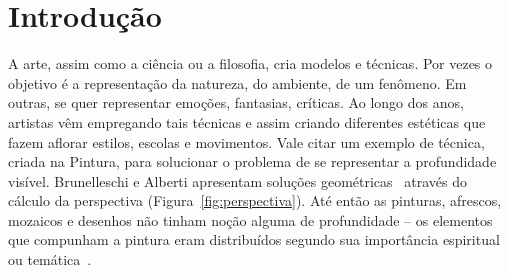 



\chapter{Introdução}
\label{cap:intro} 



A arte, assim como a ciência ou a filosofia, cria modelos e
técnicas. Por vezes o objetivo é a representação da natureza, do
ambiente, de um fenômeno. Em outras, se quer representar emoções,
fantasias, críticas. Ao longo dos anos, artistas vêm empregando tais
técnicas e assim criando diferentes estéticas que fazem aflorar
estilos, escolas e movimentos. Vale citar um exemplo de técnica,
criada na Pintura, para solucionar o problema de se representar a
profundidade visível. Brunelleschi e Alberti apresentam soluções
geométricas~\cite{andersen,kemp} através do cálculo da perspectiva
(Figura~\ref{fig:perspectiva}). Até então as pinturas, afrescos,
mozaicos e desenhos não tinham noção alguma de profundidade -- os
elementos que compunham a pintura eram distribuídos segundo sua
importância espiritual ou temática~\cite{edgerton}.

